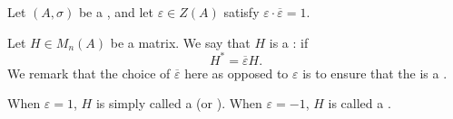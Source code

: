 \begin{definition} \label{definition:epsilon_hermitian_matrix_over_a_ring_with_involution}
    Let $(A,\sigma)$ be a , and let $\varepsilon \in Z(A)$ satisfy $\varepsilon \cdot \overline{\varepsilon} = 1$.

    Let $H \in M_n(A)$ be a matrix. We say that $H$ is a : 
    if 
    $$H^* = \overline{\varepsilon} H.$$
    We remark that the choice of $\overline{\varepsilon}$ here as opposed to $\varepsilon$ is to ensure that the  is a .

    When $\varepsilon = 1$, $H$ is simply called a  (or ). When $\varepsilon = -1$, $H$ is called a .
\end{definition}